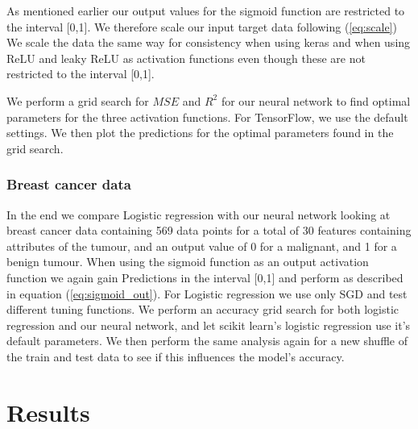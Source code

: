\documentclass[11pt]{article}
\begin{document}
As mentioned earlier our output values for the sigmoid function are restricted to the interval [0,1]. We therefore scale our input target data following (\ref{eq:scale})
We scale the data the same way for consistency when using keras and when using ReLU and leaky ReLU as activation functions even though these are not restricted to the interval [0,1].

We perform a grid search for $MSE$ and $R^2$ for our neural network to find optimal parameters for the three activation functions. For TensorFlow, we use the default settings. We then plot the predictions for the optimal parameters found in the grid search.

\subsubsection*{Breast cancer data}
In the end we compare Logistic regression with our neural network looking at breast cancer data containing 569 data points for a total of 30 features containing attributes of the tumour, and an output value of 0 for a malignant, and 1 for a benign tumour. When using the sigmoid function as an output activation function we again gain Predictions in the interval [0,1] and perform as described in equation (\ref{eq:sigmoid_out}). For Logistic regression we use only SGD and test different tuning functions. We perform an accuracy grid search for both logistic regression and our neural network, and let scikit learn's logistic regression use it's default parameters. We then perform the same analysis again for a new shuffle of the train and test data to see if this influences the model's accuracy.

\section{Results}
\end{document}
